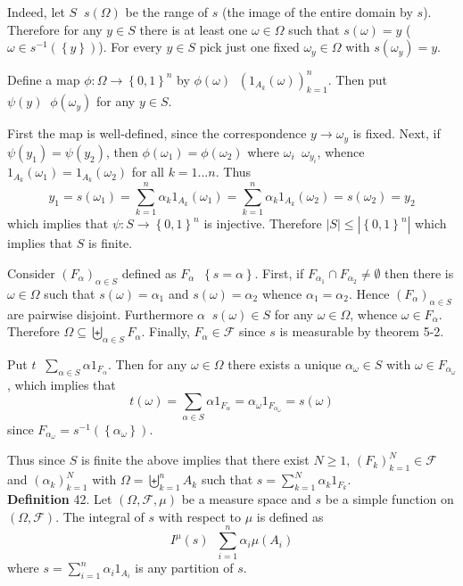 \documentclass[a4paper]{article}
\newcommand{\obj}[1]{\left\{ #1 \right \}}
\newcommand{\brac}[1]{\left ( #1 \right )}
\newcommand{\abs}[1]{\left | #1 \right |}
\newcommand{\Fcal}{\mathcal{F}}
\newcommand{\defn}{\mathop{\overset{\Delta}{=}}\nolimits}
\begin{document}
Indeed, let $S\defn s\brac{\Omega}$ be the range of $s$ (the image of the entire domain by $s$). Therefore for any $y\in S$ there is at least one $\omega\in \Omega$ such that $s\brac{\omega}=y$ ($\omega\in s^{-1}\brac{\obj{y}}$). For every $y\in S$ pick just one fixed $\omega_y\in \Omega$ with $s\brac{\omega_y}=y$. 

Define a map $\phi:\Omega\to\obj{0,1}^n$ by $\phi\brac{\omega}\defn \brac{1_{A_k}\brac{\omega}}_{k=1}^n$. Then put $\psi\brac{y}\defn \phi\brac{\omega_y}$ for any $y\in S$.

First the map is well-defined, since the correspondence $y\to\omega_y$ is fixed. Next, if $\psi\brac{y_1}=\psi\brac{y_2}$, then $\phi\brac{\omega_1}=\phi\brac{\omega_2}$ where $\omega_i\defn \omega_{y_i}$, whence $1_{A_k}\brac{\omega_1}=1_{A_k}\brac{\omega_2}$ for all $k=1\ldots n$. Thus \[y_1=s\brac{\omega_1} = \sum_{k=1}^n \alpha_k 1_{A_k}\brac{\omega_1} = \sum_{k=1}^n \alpha_k 1_{A_k}\brac{\omega_2} = s\brac{\omega_2} = y_2\] which implies that $\psi:S\to\obj{0,1}^n$ is injective. Therefore $\abs{S}\leq \abs{\obj{0,1}^n}$ which implies that $S$ is finite.

Consider $\brac{F_\alpha}_{\alpha\in S}$ defined as $F_\alpha\defn \obj{s=\alpha}$. First, if $F_{\alpha_1}\cap F_{\alpha_2}\neq \emptyset$ then there is $\omega\in \Omega$ such that $s\brac{\omega}=\alpha_1$ and $s\brac{\omega}=\alpha_2$ whence $\alpha_1=\alpha_2$. Hence $\brac{F_\alpha}_{\alpha\in S}$ are pairwise disjoint. Furthermore $\alpha\defn s\brac{\omega}\in S$ for any $\omega\in\Omega$, whence $\omega\in F_\alpha$. Therefore $\Omega\subseteq \biguplus_{\alpha\in S} F_\alpha$. Finally, $F_\alpha\in \Fcal$ since $s$ is measurable by theorem 5-2.

Put $t\defn \sum_{\alpha\in S} \alpha 1_{F_\alpha}$. Then for any $\omega\in \Omega$ there exists a unique $\alpha_\omega\in S$ with $\omega\in F_{\alpha_\omega}$, which implies that \[t\brac{\omega} = \sum_{\alpha\in S} \alpha 1_{F_\alpha} = \alpha_\omega 1_{F_{\alpha_\omega}} = s\brac{\omega}\] since $F_{\alpha_\omega}=s^{-1}\brac{\obj{\alpha_\omega}}$.

Thus since $S$ is finite the above implies that there exist $N\geq1$, $\brac{F_k}_{k=1}^N\in \Fcal$ and $\brac{\alpha_k}_{k=1}^N$ with $\Omega=\biguplus_{k=1}^n A_k$ such that $s=\sum_{k=1}^N \alpha_k 1_{F_k}$.\\


\noindent \textbf{Definition} 42.
Let $\brac{\Omega, \Fcal, \mu}$ be a measure space and $s$ be a simple function on $\brac{\Omega, \Fcal}$. The integral of $s$ with respect to $\mu$ is defined as \[I^\mu\brac{s} \defn \sum_{i=1}^n \alpha_i \mu\brac{A_i}\] where $s = \sum_{i=1}^n \alpha_i 1_{A_i}$ is any partition of $s$.
\end{document}
